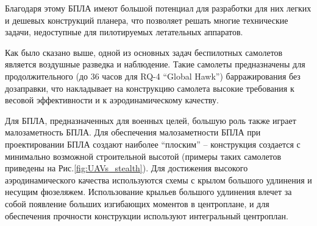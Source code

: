 

Благодаря этому БПЛА имеют большой потенциал для разработки для них легких и дешевых конструкций планера, что позволяет решать многие технические задачи, недоступные для пилотируемых летательных аппаратов.







Как было сказано выше, одной из основных задач беспилотных самолетов является воздушные разведка и наблюдение. Такие самолеты предназначены для продолжительного (до 36 часов для RQ-4 ``Global Hawk'') барражирования без дозаправки, что накладывает на конструкцию самолета высокие требования к весовой эффективности и к аэродинамическому качеству.




Для БПЛА, предназначенных для военных целей, большую роль также играет малозаметность БПЛА. Для обеспечения малозаметности БПЛА при проектировании БПЛА создают наиболее ``плоским'' -- конструкция создается с минимально возможной строительной высотой (примеры таких самолетов приведены на Рис.\ref{fig:UAVs_stealth}). Для достижения высокого аэродинамического качества используются схемы с крылом большого удлинения и несущим фюзеляжем. Использование крыльев большого удлинения влечет за собой появление больших изгибающих моментов в центроплане, и для обеспечения прочности конструкции используют интегральный центроплан. 


